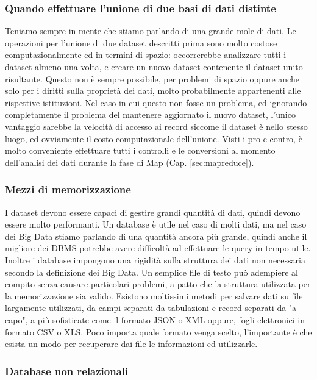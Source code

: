 \subsubsection{Quando effettuare l'unione di due basi di dati distinte}
Teniamo sempre in mente che stiamo parlando di una grande mole di dati. Le operazioni per l'unione di due dataset descritti prima sono molto costose computazionalmente ed in termini di spazio: occorrerebbe analizzare tutti i dataset almeno una volta, e creare un nuovo dataset contenente il dataset unito risultante. Questo non è sempre possibile, per problemi di spazio oppure anche solo per i diritti sulla proprietà dei dati, molto probabilmente appartenenti alle rispettive istituzioni. Nel caso in cui questo non fosse un problema, ed ignorando completamente il problema del mantenere aggiornato il nuovo dataset, l'unico vantaggio sarebbe la velocità di accesso ai record siccome il dataset è nello stesso luogo, ed ovviamente il costo computazionale dell'unione. Visti i pro e contro, è molto conveniente effettuare tutti i controlli e le conversioni al momento dell'analisi dei dati durante la fase di Map (Cap. \ref{sec:mapreduce}).

\subsubsection{Mezzi di memorizzazione}
I dataset devono essere capaci di gestire grandi quantità di dati, quindi devono essere molto performanti. Un database è utile nel caso di molti dati, ma nel caso dei Big Data stiamo parlando di una quantità ancora più grande, quindi anche il migliore dei DBMS potrebbe avere difficoltà ad effettuare le query in tempo utile. Inoltre i database impongono una rigidità sulla struttura dei dati non necessaria secondo la definizione dei Big Data. Un semplice file di testo può adempiere al compito senza causare particolari problemi, a patto che la struttura utilizzata per la memorizzazione sia valido. Esistono moltissimi metodi per salvare dati su file largamente utilizzati, da campi separati da tabulazioni e record separati da "a capo", a più sofisticate come il formato JSON o XML oppure, fogli elettronici in formato CSV o XLS. Poco importa quale formato venga scelto, l'importante è che esista un modo per recuperare dai file le informazioni ed utilizzarle.

\subsubsection{Database non relazionali}
 

